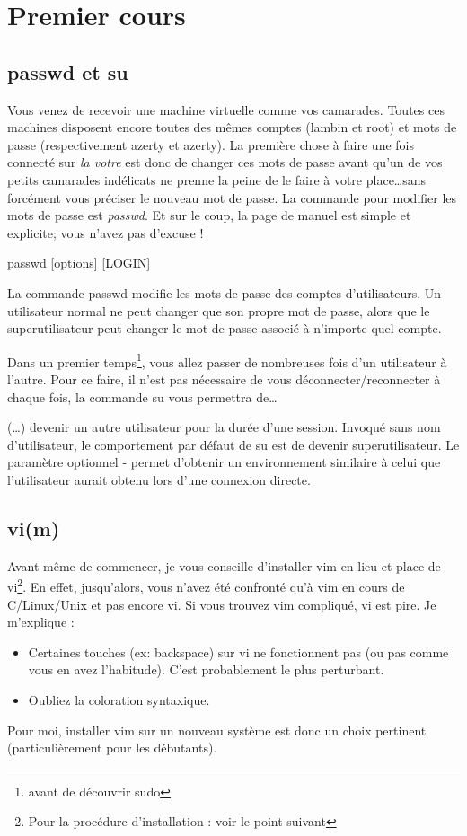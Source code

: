 \documentclass[a4paper,11pt]{article}
\newcommand{\man}[2]{
    \begin{tcolorbox}[toprule=3mm,width=\textwidth,outer arc=0mm,colbacktitle=grayman,coltitle=black,colback={grayman},colframe={grayman},title={man : \tt #1}]
        \tt\raggedright #2
    \end{tcolorbox}
}
\newcommand{\mandesc}[1]{
    \begin{adjustwidth}{0.8cm}{}
        #1
    \end{adjustwidth}
}
\begin{document}
\section{Premier cours}
\subsection{passwd et su}
\par Vous venez de recevoir une machine virtuelle comme vos camarades. Toutes ces machines disposent encore toutes des mêmes comptes (lambin et root) et mots de passe (respectivement azerty et azerty). La première chose à faire une fois connecté sur \emph{la votre} est donc de changer ces mots de passe avant qu'un de vos petits camarades indélicats ne prenne la peine de le faire à votre place\ldots sans forcément vous préciser le nouveau mot de passe. La commande pour modifier les mots de passe est \emph{passwd}. Et sur le coup, la page de manuel est simple et explicite; vous n'avez pas d'excuse !
\man{passwd}{
passwd [options] [LOGIN]
\mandesc{La commande passwd modifie les mots de passe des comptes d'utilisateurs. Un utilisateur normal ne peut changer que son propre mot de passe, alors que le superutilisateur peut changer le mot de passe associé à n'importe quel compte.}
}
\par Dans un premier temps\footnote{avant de découvrir sudo}, vous allez passer de nombreuses fois d'un utilisateur à l'autre. Pour ce faire, il n'est pas nécessaire de vous déconnecter/reconnecter à chaque fois, la commande su vous permettra de\ldots
\man{su}{
(\dots) devenir un autre utilisateur pour la durée d'une session. Invoqué sans nom d'utilisateur, le comportement par défaut de su est de devenir superutilisateur. Le paramètre optionnel - permet d'obtenir un environnement similaire à celui que l'utilisateur aurait obtenu lors d'une connexion directe.}

\subsection{vi(m)}
\par Avant même de commencer, je vous conseille d'installer vim en lieu et place de vi\footnote{Pour la procédure d'installation : voir le point suivant}. En effet, jusqu'alors, vous n'avez été confronté qu'à vim en cours de C/Linux/Unix et pas encore vi. Si vous trouvez vim compliqué, vi est pire. Je m'explique :
\begin{itemize}
    \item Certaines touches (ex: backspace) sur vi ne fonctionnent pas (ou pas comme vous en avez l'habitude). C'est probablement le plus perturbant.
    \item Oubliez la coloration syntaxique.
\end{itemize}
\par Pour moi, installer vim sur un nouveau système est donc un choix pertinent (particulièrement pour les débutants).
\end{document}

